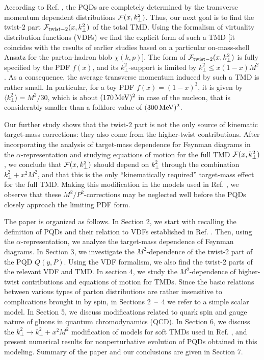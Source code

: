 \documentclass[final,5p,times,twocolumn]{elsarticle}
\begin{document}
According to Ref. \cite{Radyushkin:2016hsy}, 
  the PQDs are completely determined by the transverse momentum dependent 
distributions ${\cal F}(x, k_\perp^2)$.  Thus, our next goal is to
find the twist-2 part  ${\cal F}_{\rm twist-2}(x, k_\perp^2)$  of the total TMD.
Using the formalism of virtuality distribution functions   (VDFs) 
\cite{Radyushkin:2014vla,Radyushkin:2015gpa}
we find the   explicit form of such a TMD [it coincides with
the  results of earlier studies  \cite{Barbieri:1976rd,Ellis:1982cd}
based on a particular on-mass-shell Ansatz for the  parton-hadron blob $\chi (k,p)$]. 
The form of  ${\cal F}_{\rm twist-2}(x, k_\perp^2)$ 
 is fully specified   by the  PDF $f(x)$, and 
its  $k_\perp^2$-support  
is limited by $k_\perp^2 \leq x(1-x)M^2$.  
As a consequence, the average transverse momentum 
induced by such a TMD is rather small. In particular, for 
a toy PDF $f(x) = (1-x)^3$, it is given by $\langle k_\perp^2 \rangle = M^2/30$,
which is about $(170\,  {\rm MeV})^2$ in case of the nucleon,
that   is considerably smaller than a folklore value of $(300\,  {\rm MeV})^2$. 

Our further study shows  that the twist-2 part is not the only source of 
 kinematic target-mass corrections: they 
also come from the higher-twist
contributions.  After   incorporating 
the analysis  of target-mass dependence  for Feynman diagrams in the 
\mbox{$\alpha$-representation} and studying  equations of motion for 
the full TMD ${\cal F}(x, k_\perp^2)$, we conclude that 
${\cal F}(x, k_\perp^2)$  should depend  on $k_\perp^2$ through the combination
$k_\perp^2+x^2 M^2$, and that this is the  only  
 ``kinematically required''  target-mass effect for the full TMD. Making this modification 
 in the models used in Ref. \cite{Radyushkin:2016hsy}, we observe that
 these  $M^2/P^2$-corrections may be neglected
 well before the PQDs  closely approach the limiting PDF  form. 

 
 The paper is organized as follows.  
In  Section  2,   we start with  recalling the definition of PQDs and their  relation to VDFs 
established in Ref. \cite{Radyushkin:2016hsy}.
Then,  using the $\alpha$-representation,
 we analyze the target-mass dependence of Feynman diagrams.
 In Section 3, 
we investigate the $M^2$-dependence of the twist-2 part of the PQD $Q (y,P)$.
Using the VDF formalism, we also find the \mbox{twist-2}  parts of the relevant VDF and TMD.
In section 4, we study the $M^2$-dependence of higher-twist
contributions and equations of motion for TMDs. 
Since the basic relations between various types of  parton distributions
 are rather insensitive to complications brought in  by spin,
 in Sections  \mbox{2 -- 4}   we refer to a simple scalar model.
 In Section  5,   we discuss modifications related to  quark spin 
 and gauge nature of gluons in quantum chromodynamics (QCD). 
 In Section 6, we discuss the  $k_\perp^2 \to k_\perp^2+x^2 M^2$
 modification of  models for soft TMDs used in Ref. \cite{Radyushkin:2016hsy}, 
and 
   present  numerical results  for  nonperturbative evolution 
 of PQDs obtained in this  modeling.   Summary of the paper and our conclusions are given in Section 7. 
 
\end{document}
